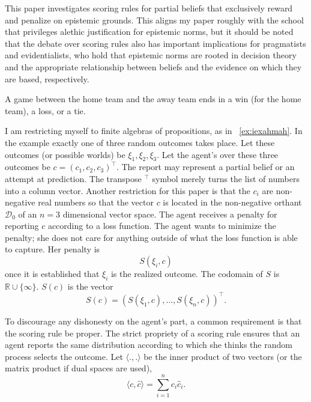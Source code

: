 \documentclass[12pt]{article}
\begin{document}
This paper investigates scoring rules for partial beliefs that
exclusively reward and penalize on epistemic grounds. This aligns my
paper roughly with the school that privileges alethic justification
for epistemic norms, but it should be noted that the debate over
scoring rules also has important implications for pragmatists and
evidentialists, who hold that epistemic norms are rooted in decision
theory and the appropriate relationship between beliefs and the
evidence on which they are based, respectively.

\begin{example}[Trichotomy]
  \label{ex:iexahmah}
  A game between the home team and the away team ends in a win (for
  the home team), a loss, or a tie.
\end{example}

I am restricting myself to finite algebras of propositions, as in
{\xample}~\ref{ex:iexahmah}. In the example exactly one of three
random outcomes takes place. Let these outcomes (or possible worlds)
be $\xi_{1},\xi_{2},\xi_{3}$. Let the agent's  over
these three outcomes be $c=(c_{1},c_{2},c_{3})^{\intercal}$. The
report may represent a partial belief or an attempt at prediction. The
transpose $^{\intercal}$ symbol merely turns the list of numbers into
a column vector. Another restriction for this paper is that the
$c_{i}$ are non-negative real numbers so that the vector $c$ is
located in the non-negative orthant $\mathcal{D}_{0}$ of an $n=3$
dimensional vector space. The agent receives a penalty for reporting
$c$ according to a loss function. The agent wants to minimize the
penalty; she does not care for anything outside of what the loss
function is able to capture. Her penalty is
\begin{equation}
  \label{eq:choirail}
  S(\xi_{i},c)
\end{equation}
once it is established that $\xi_{i}$ is the realized outcome. The
codomain of $S$ is $\mathbb{R}\cup\{\infty\}$. $S(c)$ is the vector
\begin{equation}
  \label{eq:bohraila}
  S(c)=\left(S(\xi_{1},c),{\ldots},S(\xi_{n},c)\right)^{\intercal}.
\end{equation}

To discourage any dishonesty on the agent's part, a common requirement
is that the scoring rule be proper. The strict propriety of a scoring rule
ensures that an agent reports the same distribution according to which
she thinks the random process selects the outcome.
Let $\langle{}.,.\rangle$ be the inner product of two vectors (or the
matrix product if dual spaces are used),
\begin{equation}
  \label{eq:quiweivo}
  \langle{}c,\hat{c}\rangle=\sum_{i=1}^{n}c_{i}\hat{c}_{i}.
\end{equation}
\end{document}
